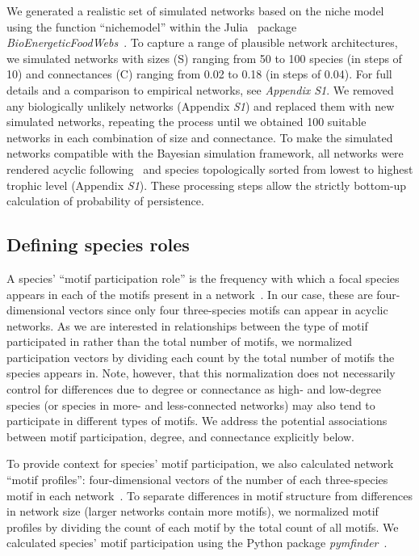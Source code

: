 \documentclass[12pt]{article}
\begin{document}
\begin{spacing}{2.0}
		We generated a realistic set of simulated networks based on the niche model~\citep{Williams2000,Stouffer2007} using the function ``nichemodel'' within the Julia~\citep{Bezanson2017julia} package \emph{BioEnergeticFoodWebs}~\citep{bioenergfw,Delmas2017}. 
		To capture a range of plausible network architectures, we simulated networks with sizes (S) ranging from 50 to 100 species (in steps of 10) and connectances (C) ranging from 0.02 to 0.18 (in steps of 0.04). 
		For full details and a comparison to empirical networks, see \emph{Appendix S1}.
		We removed any biologically unlikely networks (Appendix \emph{S1}) and replaced them with new simulated networks, repeating the process until we obtained 100 suitable networks in each combination of size and connectance.
		To make the simulated networks compatible with the Bayesian simulation framework, all networks were rendered acyclic following~\citet{Allesina2009functional} and species topologically sorted from lowest to highest trophic level (Appendix \emph{S1}). 
		 These processing steps allow the strictly bottom-up calculation of probability of persistence.
		
		
	\subsection*{Defining species roles}

        A species' ``motif participation role'' is the frequency with which a focal species appears in each of the motifs present in a network~\citep{Stouffer2012}.
        In our case, these are four-dimensional vectors since only four three-species motifs can appear in acyclic networks.
        As we are interested in relationships between the type of motif participated in rather than the total number of motifs, we normalized participation vectors by dividing each count by the total number of motifs the species appears in.
        Note, however, that this normalization does not necessarily control for differences due to degree or connectance as high- and low-degree species (or species in more- and less-connected networks) may also tend to participate in different types of motifs.
        We address the potential associations between motif participation, degree, and connectance explicitly below. 
        
        
        To provide context for species' motif participation, we also calculated network ``motif profiles'': four-dimensional vectors of the number of each three-species motif in each network~\citep{Stouffer2012}.
        To separate differences in motif structure from differences in network size (larger networks contain more motifs), we normalized motif profiles by dividing the count of each motif by the total count of all motifs. 
		We calculated species' motif participation using the Python package \emph{pymfinder}~\citep{pymfinder}.



\end{spacing}
\end{document}
